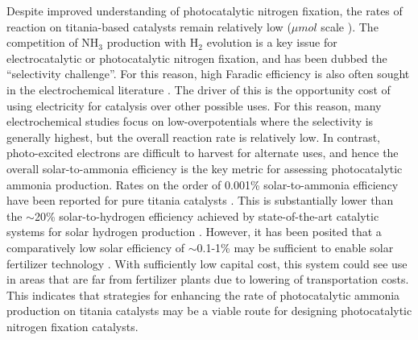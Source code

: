 
Despite improved understanding of photocatalytic nitrogen fixation, the rates of reaction on titania-based catalysts remain relatively low ($\mu mol$ scale \cite{Hirakawa_2017}). The competition of NH$_3$ production with H$_2$ evolution is a key issue for electrocatalytic or photocatalytic nitrogen fixation, and has been dubbed the ``selectivity challenge''.\cite{Singh_2017} For this reason, high Faradic efficiency is also often sought in the electrochemical literature \cite{McPherson_2019}. The driver of this is the opportunity cost of using electricity for catalysis over other possible uses. For this reason, many electrochemical studies focus on low-overpotentials where the selectivity is generally highest, but the overall reaction rate is relatively low. In contrast, photo-excited electrons are difficult to harvest for alternate uses, and hence the overall solar-to-ammonia efficiency is the key metric for assessing photocatalytic ammonia production. Rates on the order of 0.001\% solar-to-ammonia efficiency have been reported for pure titania catalysts \cite{Hirakawa_2017}. This is substantially lower than the $\sim$20\% solar-to-hydrogen efficiency achieved by state-of-the-art catalytic systems for solar hydrogen production \cite{Nakamura_2015, Jia_2016}. However, it has been posited that a comparatively low solar efficiency of $\sim$0.1-1\% may be sufficient to enable solar fertilizer technology \cite{Comer_2019,Medford_2017}. With sufficiently low capital cost, this system could see use in areas that are far from fertilizer plants due to lowering of transportation costs. This indicates that strategies for enhancing the rate of photocatalytic ammonia production on titania catalysts may be a viable route for designing photocatalytic nitrogen fixation catalysts.

